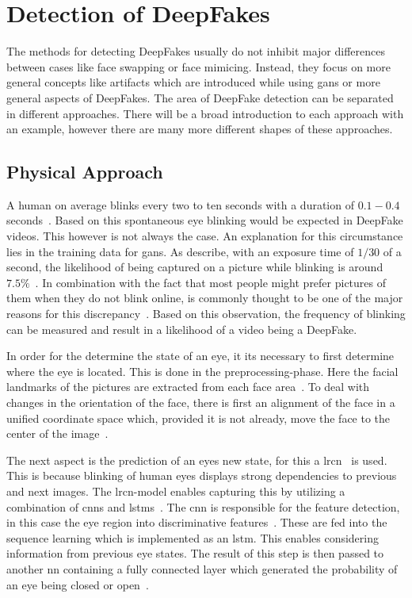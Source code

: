 \section{Detection of DeepFakes}
The methods for detecting DeepFakes usually do not inhibit major differences
between cases like face swapping or face mimicing.
Instead, they focus on more general concepts like artifacts which are introduced
while using \glspl{gan} or more general aspects of DeepFakes.
The area of DeepFake detection can be separated in different approaches.
There will be a broad introduction to each approach with an example, however there
are many more different shapes of these approaches.

\subsection{Physical Approach}
A human on average blinks every two to ten seconds with a duration of \(0.1-0.4\)
seconds~\cite{li_ictu_2018}. Based on this spontaneous eye blinking would be
expected in DeepFake videos. This however is not always the case. An explanation
for this circumstance lies in the training data for \glspl{gan}. As 
\textcite{li_ictu_2018} describe, with an exposure time of \(1/30\) of a second,
the likelihood of being captured on a picture while blinking is around \(7.5\%\)~\cite{li_ictu_2018}.
In combination with the fact that most people might prefer pictures of them when
they do not blink online, is commonly thought to be one of the major reasons for
this discrepancy~\cite{pishori_detecting_2020}. Based on this observation, the
frequency of blinking can be measured and result in a likelihood of a video being
a DeepFake.

\par
In order for the determine the state of an eye, it its necessary to first determine
where the eye is located. This is done in the preprocessing-phase. Here the facial
landmarks of the pictures are extracted from each face area~\cite{li_ictu_2018}.
To deal with changes in the orientation of the face, there is first an alignment
of the face in a unified coordinate space which, provided it is not already,
move the face to the center of the image~\cite{li_ictu_2018}.

\par
The next aspect is the prediction of an eyes new state, for this a \gls{lrcn}~\cite{donahue_long-term_2014}
is used. This is because blinking of human eyes displays strong dependencies to
previous and next images. The \gls{lrcn}-model enables capturing this by utilizing
a combination of \glspl{cnn} and \glspl{lstm}~\cite{donahue_long-term_2014}.
The \gls{cnn} is responsible for the feature detection, in this case the eye
region into discriminative features~\cite{li_ictu_2018,donahue_long-term_2014}. 
These are fed into the sequence learning which is implemented as an \gls{lstm}.
This enables considering information from previous eye states. The result of
this step is then passed to another \gls{nn} containing a fully connected layer
which generated the probability of an eye being closed or open~\cite{li_ictu_2018}.

